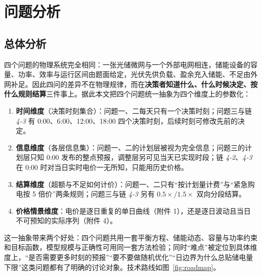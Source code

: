 \section{问题分析}

\subsection{总体分析}

四个问题的物理系统完全相同：一张光储微网与一个外部电网相连，储能设备的容量、功率、效率与运行区间由题面给定，光伏先供负载、盈余充入储能、不足由外网补足。因此四问的差异不在物理规律，而在\textbf{决策者知道什么、什么时候决定、按什么规则结算}三件事上。据此本文把四个问题统一抽象为四个维度上的参数化：

\begin{enumerate}[leftmargin=2em,itemsep=1pt]
  \item \textbf{时间维度}（决策时刻集合）：问题一、二每天只有一个决策时刻；问题三与链 \emph{4-3} 有 0:00、6:00、12:00、18:00 四个决策时刻，后续时刻可修改先前的决定。
  \item \textbf{信息维度}（各层信息集）：问题一、二的计划层被视为完全信息；问题三的计划层只知 0:00 发布的整点预报，调整层另可见当天已实现时段；链 \emph{4-2}、\emph{4-3} 在 0:00 时对当日实时电价一无所知，只能用历史价格。
  \item \textbf{结算维度}（超额与不足如何计价）：问题一、二只有“按计划量计费”与“紧急购电按 5 倍价”两条规则；问题三与链 \emph{4-3} 另有 $0.5\times/1.5\times$ 双向分段结算。
  \item \textbf{价格情景维度}：电价是逐日重复的单日曲线（附件 1），还是逐日波动且当日不可预知的实际序列（附件 4）。
\end{enumerate}

这一抽象带来两个好处：四个问题共用一套平衡方程、储能动态、容量与功率约束和目标函数，模型规模与正确性可用同一套方法检验；同时“难点”被定位到具体维度上，“是否需要更多时刻的预报”“要不要做随机优化”“日边界为什么总贴储电量下限”这类问题都有了明确的讨论对象。技术路线如图~\ref{fig:roadmap}。

